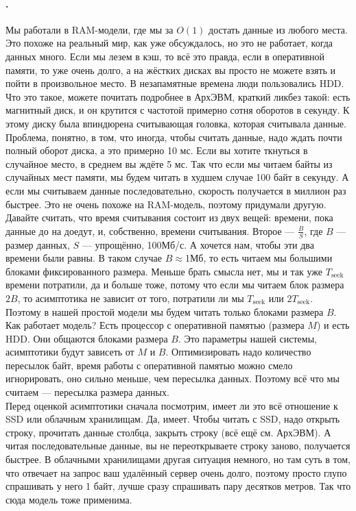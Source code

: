 \documentclass{article}
\begin{document}
    \paragraph{.}
    Мы работали в RAM-модели, где мы за $O(1)$ достать данные из любого места. Это похоже на реальный мир, как уже обсуждалось, но это не работает, когда данных много. Если мы лезем в кэш, то всё это правда, если в оперативной памяти, то уже очень долго, а на жёстких дисках вы просто не можете взять и пойти в произвольное место. В незапамятные времена люди пользовались HDD. Что это такое, можете почитать подробнее в АрхЭВМ, краткий ликбез такой: есть магнитный диск, и он крутится с частотой примерно сотня оборотов в секунду. К этому диску была впиндюрена считывающая головка, которая считывала данные. Проблема, понятно, в том, что иногда, чтобы считать данные, надо ждать почти полный оборот диска, а это примерно 10 мс. Если вы хотите ткнуться в случайное место, в среднем вы ждёте 5 мс. Так что если мы читаем байты из случайных мест памяти, мы будем читать в худшем случае 100 байт в секунду. А если мы считываем данные последовательно, скорость получается в миллион раз быстрее. Это не очень похоже на RAM-модель, поэтому придумали другую.\\
    Давайте считать, что время считывания состоит из двух вещей: времени, пока данные до на доедут, и, собственно, времени считывания. Второе --- $\frac BS$, где $B$ --- размер данных, $S$ --- упрощённо, 100Мб/с. А хочется нам, чтобы эти два времени были равны. В таком случае $B\approx$1Мб, то есть читаем мы большими блоками фиксированного размера. Меньше брать смысла нет, мы и так уже $T_{\mathrm{seek}}$ времени потратили, да и больше тоже, потому что если мы читаем блок размера $2B$, то асимптотика не зависит от того, потратили ли мы $T_{\mathrm{seek}}$ или $2T_{\mathrm{seek}}$. Поэтому в нашей простой модели мы будем читать только блоками размера $B$. Как работает модель? Есть процессор с оперативной памятью (размера $M$) и есть HDD. Они общаются блоками размера $B$. Это параметры нашей системы, асимптотики будут зависеть от $M$ и $B$. Оптимизировать надо количество пересылок байт, время работы с оперативной памятью можно смело игнорировать, оно сильно меньше, чем пересылка данных. Поэтому всё что мы считаем --- пересылка размера данных.\\
    Перед оценкой асимптотики сначала посмотрим, имеет ли это всё отношение к SSD или облачным хранилищам. Да, имеет. Чтобы читать с SSD, надо открыть строку, прочитать данные столбца, закрыть строку (всё ещё см. АрхЭВМ). А читая последовательные данные, вы не переоткрываете строку заново, получается быстрее. В облачными хранилищами другая ситуация немного, но там суть в том, что отвечает на запрос ваш удалённый сервер очень долго, поэтому просто глупо спрашивать у него 1 байт, лучше сразу спрашивать пару десятков метров. Так что сюда модель тоже применима.\\
\end{document}
